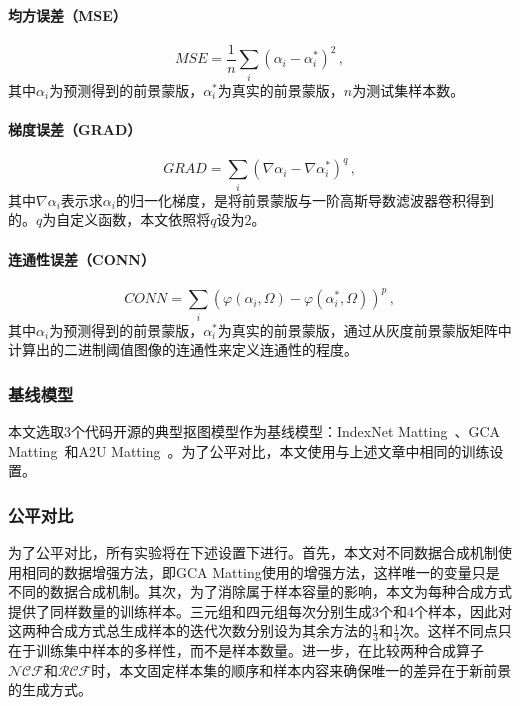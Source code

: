 \documentclass[supercite]{HustGraduPaper}
\begin{document}
	\paragraph{均方误差（MSE）}
	\begin{equation}
		MSE=\frac{1}{n}\sum\limits_i\left(\alpha_i-\alpha_i^*\right)^2\,,
	\end{equation}
	其中$\alpha_i$为预测得到的前景蒙版，$\alpha_i^*$为真实的前景蒙版，$n$为测试集样本数。
	\paragraph{梯度误差（GRAD）}
	\begin{equation}
		GRAD=\sum\limits_i\left(\nabla\alpha_i-\nabla\alpha_i^*\right)^q\,,
	\end{equation}
	其中$\nabla\alpha_i$表示求$\alpha_i$的归一化梯度，是将前景蒙版与一阶高斯导数滤波器卷积得到的。$q$为自定义函数，本文依照\cite{metrics}将$q$设为$2$。
	\paragraph{连通性误差（CONN）}
	\begin{equation}
		CONN=\sum_{i}\left(\varphi\left(\alpha_{i}, \Omega\right)-\varphi\left(\alpha_{i}^{*}, \Omega\right)\right)^{p}\,,
	\end{equation}
	其中$\alpha_i$为预测得到的前景蒙版，$\alpha_i^*$为真实的前景蒙版，通过从灰度前景蒙版矩阵中计算出的二进制阈值图像的连通性来定义连通性的程度。

	\subsubsection{基线模型}
	本文选取3个代码开源的典型抠图模型作为基线模型：IndexNet Matting~\cite{index}、GCA Matting~\cite{GCA}和A2U Matting~\cite{A2U}。为了公平对比，本文使用与上述文章中相同的训练设置。

	\subsubsection{公平对比}
	为了公平对比，所有实验将在下述设置下进行。首先，本文对不同数据合成机制使用相同的数据增强方法，即GCA Matting使用的增强方法，这样唯一的变量只是不同的数据合成机制。其次，为了消除属于样本容量的影响，本文为每种合成方式提供了同样数量的训练样本。三元组和四元组每次分别生成$3$个和$4$个样本，因此对这两种合成方式总生成样本的迭代次数分别设为其余方法的$\frac{1}{3}$和$\frac{1}{4}$次。这样不同点只在于训练集中样本的多样性，而不是样本数量。进一步，在比较两种合成算子$\mathcal{NCF}$和$\mathcal{RCF}$时，本文固定样本集的顺序和样本内容来确保唯一的差异在于新前景的生成方式。
\end{document}
